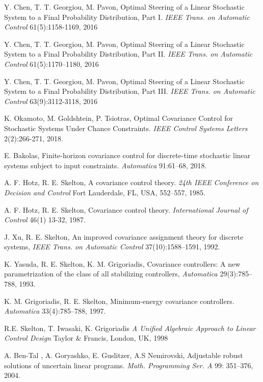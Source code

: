 \documentclass[letterpaper,11pt]{article}
\begin{document}
\begin{thebibliography}{1}
Y. Chen, T. T. Georgiou, M. Pavon,
Optimal Steering of a Linear Stochastic System to a Final Probability Distribution, Part I.
{\it IEEE Trans. on Automatic Control} 61(5):1158-1169, 2016

Y. Chen, T. T. Georgiou, M. Pavon,
Optimal Steering of a Linear Stochastic System to a Final Probability Distribution, Part II.
{\it IEEE Trans. on Automatic Control} 61(5):1170--1180, 2016

Y. Chen, T. T. Georgiou, M. Pavon,
Optimal Steering of a Linear Stochastic System to a Final Probability Distribution, Part III.
{\it IEEE Trans. on Automatic Control} 63(9):3112-3118, 2016

K. Okamoto, M. Goldshtein, P. Tsiotras, 
Optimal Covariance Control for Stochastic Systems Under Chance Constraints.
{\it IEEE Control Systems Letters} 2(2):266-271, 2018. 

E. Bakolas,
Finite-horizon covariance control for discrete-time stochastic linear
systems subject to input constraints.
{\it Automatica} 91:61--68, 2018.

A. F. Hotz, R. E. Skelton, 
A covariance control theory.
{\it 24th IEEE Conference on Decision and Control } Fort Lauderdale, FL, USA, 552--557, 1985.

A. F. Hotz, R. E. Skelton, 
Covariance control theory.
{\it International Journal of Control } 46(1) 13-32, 1987.

J. Xu, R. E. Skelton, 
An improved covariance assignment theory for discrete systems, 
{\it IEEE Trans. on Automatic Control} 37(10):1588--1591, 1992.

K. Yasuda, R. E. Skelton, K. M. Grigoriadis,
Covariance controllers: A new parametrization of the class of all stabilizing controllers,
{\it Automatica} 29(3):785--788, 1993.

K. M. Grigoriadis, R. E. Skelton,
Minimum-energy covariance controllers.
{\it Automatica} 33(4):785--788, 1997.

R.E. Skelton, T. Iwasaki, K. Grigoriadis
{\it A Unified Algebraic Approach to Linear Control Design}  
Taylor \& Francis, London, UK, 1998


A. Ben-Tal , A. Goryashko, E. Guslitzer, A.S Nemirovski,
Adjustable robust solutions of uncertain linear programs.
{\it Math. Programming Ser. A} 99: 351--376, 2004.


\end{thebibliography}
\end{document}
